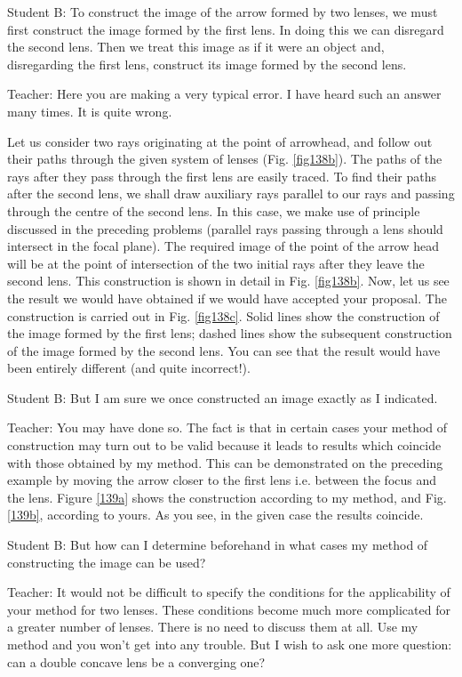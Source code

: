 \documentclass[a4paper,12pt]{book}
\begin{document}
{{\sc Student B:} To construct the image of the arrow formed by two lenses, we must first construct the image formed by the first lens. In doing this we can disregard the second lens. Then we treat this image as if it were an object and, disregarding the first lens, construct its image formed by the second lens.

{\sc Teacher:} Here you are making a very typical error. I have heard such an answer many times. It is quite wrong.

Let us consider two rays originating at the point of arrowhead, and follow out their paths through the given system of lenses (Fig. \ref{fig138b}). The paths of the rays after they pass through the first lens are easily traced. To find their paths after the second lens, we shall draw auxiliary rays parallel to our rays and passing through the centre of the second lens. In this case, we make use of principle discussed in the preceding problems (parallel rays passing through a lens should intersect in the focal plane). The required image of the point of the arrow head will be at the point of intersection of the two initial rays after they leave the second lens. This construction is shown in detail in Fig. \ref{fig138b}. Now, let us see the result we would have obtained if we would have accepted your proposal. The construction is carried out in Fig. \ref{fig138c}. Solid lines show the construction of the image formed by the first lens; dashed lines show the subsequent construction of the image formed by the second lens. You can see that the result would have been entirely different (and quite incorrect!). 

{\sc Student B:} But I am sure we once constructed an image exactly as I indicated.

{\sc Teacher:} You may have done so. The fact is that in certain cases your  method of construction may turn out to be valid because it leads to results which coincide with those obtained by my method. This can be demonstrated on the preceding example by moving the arrow closer to the first lens i.e. between the focus and the lens. Figure \ref{139a} shows the construction according to my method, and Fig. \ref{139b}, according to yours. As you see, in the given case the results coincide.

{\sc Student B:} But how can I determine beforehand in what cases my method of constructing the image can be used?

{\sc Teacher:} It would not be difficult to specify the conditions for the applicability of your method for two lenses. These conditions become much more complicated for a greater number of lenses. There is no need to discuss them at all. Use my method and you won't get into any trouble. But I wish to ask one more question: can a double concave lens be a converging one?

}
\end{document}
